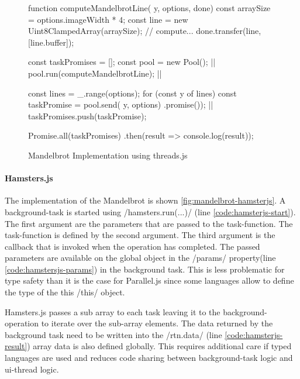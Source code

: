 \begin{figure}
	\begin{javascriptcode}
function computeMandelbrotLine({ y, options}, done) {
	const arraySize = options.imageWidth * 4;
    const line = new Uint8ClampedArray(arraySize);
    // compute...
    done.transfer(line, [line.buffer]);
}

const taskPromises = [];
const pool = new Pool(); |$\label{code:threadsjs-pool}$|
pool.run(computeMandelbrotLine); |$\label{code:threadsjs-worker}$|

const lines = _.range(options);
for (const y of lines) {
	const taskPromise = pool.send({ y, options})
	                        .promise()); |$\label{code:threadsjs-messaging}$|
	taskPromises.push(taskPromise);
}

Promise.all(taskPromises)
	.then(result => console.log(result));	
\end{javascriptcode}
\caption{Mandelbrot Implementation using threads.js}
\label{fig:mandelbrot-threadsjs}
\end{figure}

\paragraph{Hamsters.js}
The implementation of the Mandelbrot is shown \cref{fig:mandelbrot-hamsterjs}. A background-task is started using \javascriptinline/hamsters.run(...)/ (line \ref{code:hamsterjs-start}). The first argument are the parameters that are passed to the task-function. The task-function is defined by the second argument. The third argument is the callback that is invoked when the operation has completed. The passed parameters are available on the global object in the \javascriptinline/params/ property(line \ref{code:hamstersjs-params}) in the background task. This is less problematic for type safety than it is the case for Parallel.js since some languages allow to define the type of the this \javascriptinline/this/ object. 

Hamsters.js passes a sub array to each task leaving it to the background-operation to iterate over the sub-array elements. The data returned by the background task need to be written into the \javascriptinline/rtn.data/ (line \ref{code:hamsterjs-result}) array data is also defined globally. This requires additional care if typed languages are used and reduces code sharing between background-task logic and ui-thread logic.

